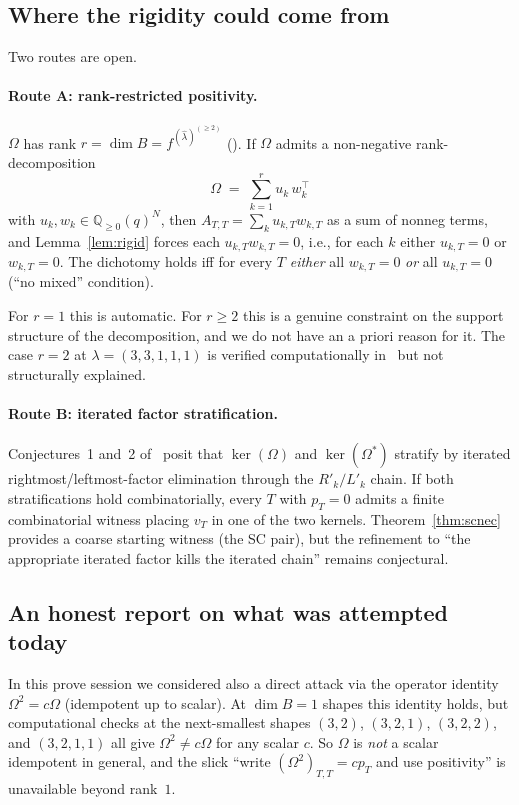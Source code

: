 \documentclass[11pt]{article}
\theoremstyle{definition}
\newcommand{\Om}{\Omega}
\newcommand{\Omstar}{\Omega^{\ast}}
\newcommand{\hatl}{\widehat\lambda}
\newcommand{\Rp}{{R'}}
\newcommand{\Lp}{{L'}}
\newcommand{\pT}{p_T}
\begin{document}
\subsection{Where the rigidity could come from}

Two routes are open.

\paragraph{Route A: rank-restricted positivity.}
$\Om$ has rank $r = \dim B = f^{(\hatl)^{(\ge 2)}}$
(\cite[Theorem~A]{rAdditivityMetaThm}). If $\Om$ admits a non-negative
rank-decomposition
\[
   \Om \;=\; \sum_{k=1}^r u_k\, w_k^\top
\]
with $u_k, w_k \in \mathbb{Q}_{\ge 0}(q)^N$, then
$A_{T,T} = \sum_k u_{k,T} w_{k,T}$ as a sum of nonneg terms, and
Lemma~\ref{lem:rigid} forces each $u_{k,T} w_{k,T} = 0$, i.e., for each
$k$ either $u_{k,T} = 0$ or $w_{k,T} = 0$. The dichotomy holds iff for
every $T$ \emph{either} all $w_{k,T} = 0$ \emph{or} all $u_{k,T} = 0$
(``no mixed'' condition).

For $r = 1$ this is automatic. For $r \ge 2$ this is a genuine
constraint on the support structure of the decomposition, and we
do not have an a priori reason for it. The case $r = 2$ at
$\lambda = (3,3,1,1,1)$ is verified computationally
in~\cite{dclassRowZero} but not structurally explained.

\paragraph{Route B: iterated factor stratification.}
Conjectures~1 and~2 of~\cite{dclassRowZero} posit that $\ker(\Om)$
and $\ker(\Omstar)$ stratify by iterated rightmost/leftmost-factor
elimination through the $\Rp_k / \Lp_k$ chain. If both stratifications
hold combinatorially, every $T$ with $\pT = 0$ admits a finite
combinatorial witness placing $v_T$ in one of the two kernels.
Theorem~\ref{thm:scnec} provides a coarse starting witness (the SC
pair), but the refinement to ``the appropriate iterated factor kills
the iterated chain'' remains conjectural.

\subsection{An honest report on what was attempted today}

In this prove session we considered also a direct attack via the
operator identity $\Om^2 = c \Om$ (idempotent up to scalar). At
$\dim B = 1$ shapes this identity holds, but computational checks at
the next-smallest shapes $(3, 2)$, $(3, 2, 1)$, $(3, 2, 2)$, and
$(3, 2, 1, 1)$ all give $\Om^2 \ne c\Om$ for any scalar $c$. So $\Om$
is \emph{not} a scalar idempotent in general, and the slick ``write
$(\Om^2)_{T,T} = c \pT$ and use positivity'' is unavailable beyond
rank~$1$.
\end{document}
